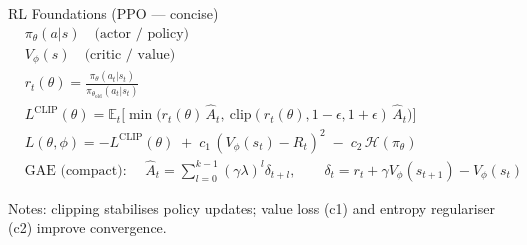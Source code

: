 \documentclass[aspectratio=169,xcolor=dvipsnames]{beamer}
\begin{document}
\begin{frame}{RL Foundations (PPO — concise)}
\scriptsize
\begin{align*}
  &\pi_\theta(a|s)\quad\text{(actor / policy)}\\
  &V_\phi(s)\quad\text{(critic / value)}\\[4pt]
  &r_t(\theta)=\frac{\pi_\theta(a_t|s_t)}{\pi_{\theta_{\text{old}}}(a_t|s_t)}\\[2pt]
  &L^{\mathrm{CLIP}}(\theta)=\mathbb{E}_t\Big[\min\big(r_t(\theta)\,\hat A_t,\ \mathrm{clip}(r_t(\theta),1-\epsilon,1+\epsilon)\,\hat A_t\big)\Big]\\[6pt]
  &L(\theta,\phi)= -L^{\mathrm{CLIP}}(\theta) \;+\; c_1\,(V_\phi(s_t)-R_t)^2 \;-\; c_2\,\mathcal H(\pi_\theta)\\[6pt]
  &\text{GAE (compact): }\quad \hat A_t=\sum_{l=0}^{k-1}(\gamma\lambda)^l\delta_{t+l},\qquad 
  \delta_t=r_t+\gamma V_\phi(s_{t+1})-V_\phi(s_t)
\end{align*}

\vspace{4pt}
\small Notes: clipping stabilises policy updates; value loss (c1) and entropy regulariser (c2) improve convergence.
\end{frame}
\end{document}
